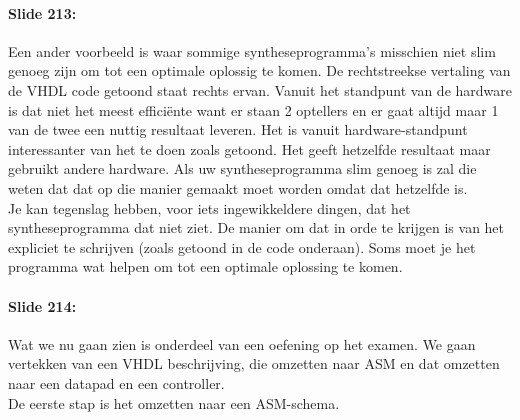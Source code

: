\documentclass[10pt,a4paper]{book}
\begin{document}
\paragraph{Slide 213:} Een ander voorbeeld is waar sommige syntheseprogramma's misschien niet slim genoeg zijn om tot een optimale oplossig te komen. De rechtstreekse vertaling van de VHDL code getoond staat rechts ervan. Vanuit het standpunt van de hardware is dat niet het meest effici\"ente want er staan 2 optellers en er gaat altijd maar 1 van de twee een nuttig resultaat leveren. Het is vanuit hardware-standpunt interessanter van het te doen zoals getoond. Het geeft hetzelfde resultaat maar gebruikt andere hardware. Als uw syntheseprogramma slim genoeg is zal die weten dat dat op die manier gemaakt moet worden omdat dat hetzelfde is.\\
Je kan tegenslag hebben, voor iets ingewikkeldere dingen, dat het syntheseprogramma dat niet ziet. De manier om dat in orde te krijgen is van het expliciet te schrijven (zoals getoond in de code onderaan). Soms moet je het programma wat helpen om tot een optimale oplossing te komen.

\paragraph{Slide 214:} Wat we nu gaan zien is onderdeel van een oefening op het examen. We gaan vertekken van een VHDL beschrijving, die omzetten naar ASM en dat omzetten naar een datapad en een controller.\\
De eerste stap is het omzetten naar een ASM-schema.
\end{document}
